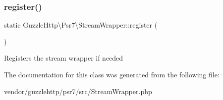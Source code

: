 \subsubsection{\texorpdfstring{register()}{register()}}
{\footnotesize\ttfamily static Guzzle\+Http\textbackslash{}\+Psr7\textbackslash{}\+Stream\+Wrapper\+::register (\begin{DoxyParamCaption}{ }\end{DoxyParamCaption})\hspace{0.3cm}{\ttfamily [static]}}

Registers the stream wrapper if needed 

The documentation for this class was generated from the following file\+:\begin{DoxyCompactItemize}
\item 
vendor/guzzlehttp/psr7/src/Stream\+Wrapper.\+php\end{DoxyCompactItemize}
